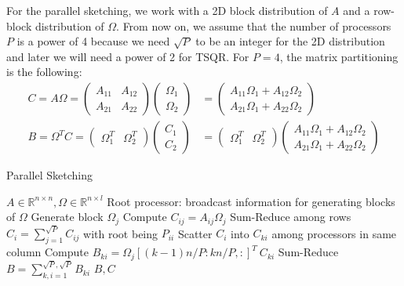 \documentclass{article}
\theoremstyle{definition}
\begin{document}
For the parallel sketching, we work with a 2D block distribution of $A$ and a
row-block distribution of $\Omega$. From now on, we assume that the number of
processors $P$ is a power of 4 because we need $\sqrt{P}$ to be an integer for
the 2D distribution and later we will need a power of 2 for TSQR. For $P=4$, the
matrix partitioning is the following:
\begin{align*}
    C = A \Omega
    = \begin{pmatrix}
        A_{11} & A_{12} \\
        A_{21} & A_{22}
    \end{pmatrix}
    \begin{pmatrix}
        \Omega_1 \\
        \Omega_2
    \end{pmatrix}
    &= \begin{pmatrix}
        A_{11} \Omega_1 + A_{12} \Omega_2 \\
        A_{21} \Omega_1 + A_{22} \Omega_2
    \end{pmatrix}
    \\
    B = \Omega^T C
    = \begin{pmatrix}
        \Omega_1^T & \Omega_2^T
    \end{pmatrix}
    \begin{pmatrix}
        C_1 \\
        C_2
    \end{pmatrix}
    &= \begin{pmatrix}
        \Omega_1^T & \Omega_2^T
    \end{pmatrix}
    \begin{pmatrix}
        A_{11} \Omega_1 + A_{12} \Omega_2 \\
        A_{21} \Omega_1 + A_{22} \Omega_2
    \end{pmatrix}
\end{align*}

\begin{algorithm}[t]
    \caption{Parallel Sketching} \label{algo:sketching}
    \begin{algorithmic}[1]
        \Require $A \in \mathbb{R}^{n \times n}, \Omega \in
                    \mathbb{R}^{n \times l}$
        \State Root processor: broadcast information for generating blocks of
                $\Omega$
            \State Generate block $\Omega_j$
            \State Compute $C_{ij} = A_{ij} \Omega_j$
            \State Sum-Reduce among rows $C_i = \sum_{j = 1}^{\sqrt{P}} C_{ij}$
                    with root being $P_{ii}$
            \State Scatter $C_i$ into $C_{ki}$ among processors in same column
            \State Compute $B_{ki} = \Omega_j[(k-1) n/P : k n/P, :]^T \ C_{ki}$
        \EndFor
        \State Sum-Reduce $B = \sum_{k,i = 1}^{\sqrt{P}, \sqrt{P}} B_{ki}$
        \Ensure $B, C$
    \end{algorithmic}
\end{algorithm}
\end{document}
